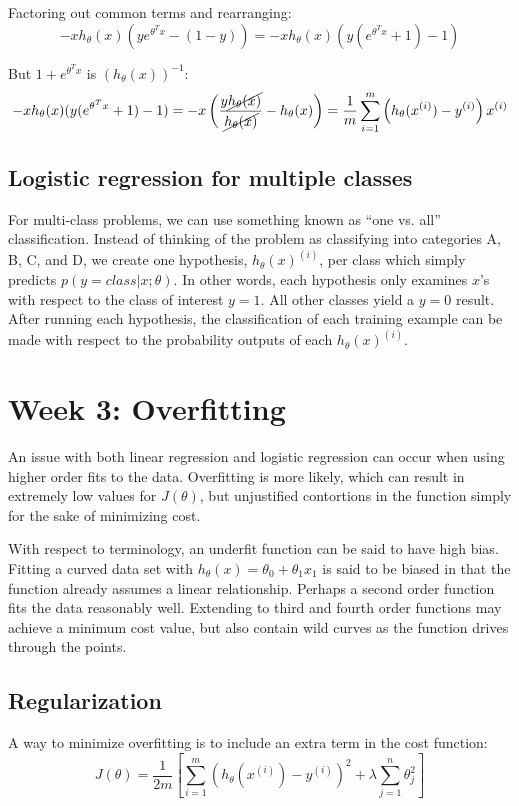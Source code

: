 \documentclass[11pt]{article}
\begin{document}
Factoring out common terms and rearranging:
\[
-xh_\theta(x) (ye^{\theta^T x}-(1-y)) = -xh_\theta(x) (y(e^{\theta^T x}+1)-1)
\]

But \(1+e^{\theta^T x}\) is \((h_\theta(x))^{-1}\):
\[
-xh_\theta(x) (y(e^{\theta^T x}+1)-1) =
-x \left( \frac{y\cancel{h_\theta(x)}}{\cancel{h_\theta(x)}}-h_\theta(x) \right) =
\frac{1}{m} \sum_{i=1}^m \left( h_\theta(x^{(i)}) - y^{(i)} \right)x^{(i)}
\]
\subsection{Logistic regression for multiple classes}
\label{sec-3-4}

For multi-class problems, we can use something known as ``one vs. all''
classification. Instead of thinking of the problem as classifying into categories A,
B, C, and D, we create one hypothesis, \(h_\theta(x)^{(i)}\), per class which simply
predicts \(p(y = class | x; \theta)\). In other words, each hypothesis only examines
\(x\)'s with respect to the class of interest \(y = 1\). All other classes yield a
\(y=0\) result. After running each hypothesis, the classification of each training
example can be made with respect to the probability outputs of each
\(h_\theta(x)^{(i)}\).
\section{Week 3: Overfitting}
\label{sec-4}

An issue with both linear regression and logistic regression can occur when using
higher order fits to the data. Overfitting is more likely, which can result in
extremely low values for \(J(\theta)\), but unjustified contortions in the function
simply for the sake of minimizing cost.

With respect to terminology, an underfit function can be said to have high
bias. Fitting a curved data set with \(h_\theta(x) = \theta_0 + \theta_1 x_1\) is said
to be biased in that the function already assumes a linear relationship. Perhaps a
second order function fits the data reasonably well. Extending to third and fourth
order functions may achieve a minimum cost value, but also contain wild curves as the
function drives through the points.
\subsection{Regularization}
\label{sec-4-1}


A way to minimize overfitting is to include an extra term in the cost function:
\[
J(\theta) = \frac{1}{2m} \left [\sum_{i=1}^m \left( h_\theta(x^{(i)}) - y^{(i)} \right)^2 +
\lambda \sum_{j=1}^n \theta^2_j \right]
\]
\end{document}
